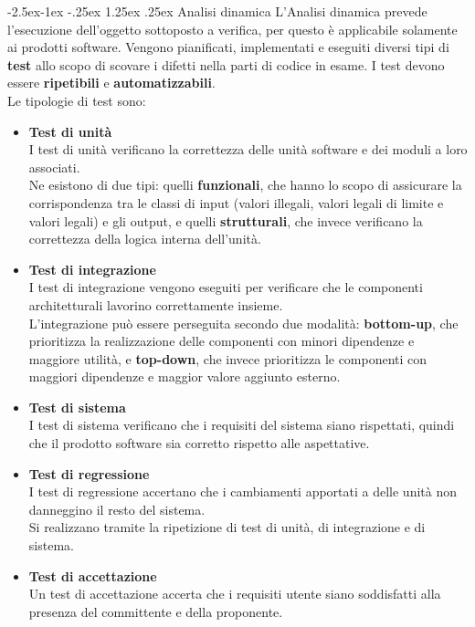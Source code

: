 \documentclass[a4paper,12pt]{article}
\makeatletter
\renewcommand\paragraph{\@startsection{paragraph}{4}{\z@}%
            {-2.5ex\@plus -1ex \@minus -.25ex}%
            {1.25ex \@plus .25ex}%
            {\normalfont\normalsize\bfseries}}
\makeatother
\begin{document}
            \paragraph{Analisi dinamica}
                L'Analisi dinamica prevede l'esecuzione dell'oggetto sottoposto a verifica, per questo è applicabile solamente ai prodotti software.
                Vengono pianificati, implementati e eseguiti diversi tipi di \textbf{test} allo scopo di scovare i difetti nella parti di codice in esame.
                I test devono essere \textbf{ripetibili} e \textbf{automatizzabili}.\\
                Le tipologie di test sono:
                \begin{itemize}
                    \item \textbf{Test di unità}\\
                        I test di unità verificano la correttezza delle unità software e dei moduli a loro associati.\\
                        Ne esistono di due tipi: quelli \textbf{funzionali}, che hanno lo scopo di assicurare la corrispondenza tra le classi di input (valori illegali, valori legali di limite e valori legali) e gli output, e quelli \textbf{strutturali}, che invece verificano la correttezza della logica interna dell'unità.
                    \item \textbf{Test di integrazione}\\
                        I test di integrazione vengono eseguiti per verificare che le componenti architetturali lavorino correttamente insieme.\\
                        L'integrazione può essere perseguita secondo due modalità: \textbf{bottom-up}, che prioritizza la realizzazione delle componenti con minori dipendenze e maggiore utilità, e \textbf{top-down}, che invece prioritizza le componenti con maggiori dipendenze e maggior valore aggiunto esterno.
                    \item \textbf{Test di sistema}\\
                        I test di sistema verificano che i requisiti del sistema siano rispettati, quindi che il prodotto software sia corretto rispetto alle aspettative.
                    \item \textbf{Test di regressione}\\
                        I test di regressione accertano che i cambiamenti apportati a delle unità non danneggino il resto del sistema.\\
                        Si realizzano tramite la ripetizione di test di unità, di integrazione e di sistema.
                    \item \textbf{Test di accettazione}\\
                        Un test di accettazione accerta che i requisiti utente siano soddisfatti alla presenza del committente e della proponente.
                \end{itemize}
\end{document}
